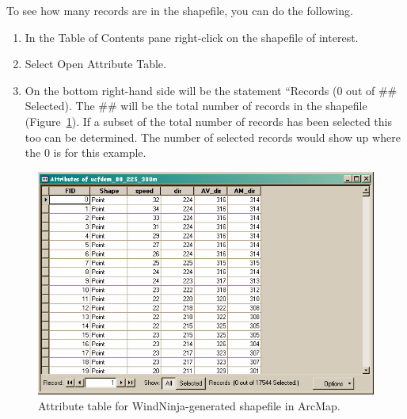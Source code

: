 \documentclass[12pt]{article}
\begin{document}
To see how many records are in the shapefile, you can do the following.
\begin{enumerate}

\item In the Table of Contents pane right-click on the shapefile of interest.
\item  Select Open Attribute Table.
\item On the bottom right-hand side will be the statement “Records (0 out of \#\# Selected). The \#\# will be the
total number of records in the shapefile (Figure~\ref{fig:Figure19}). If a subset of the total number of records has been
selected this too can be determined. The number of selected records would show up where the 0 is for this
example.

\end{enumerate}

\begin{figure}[H]
	\centering
	\includegraphics[scale=0.7]{arc_19.png}
	\caption{Attribute table for WindNinja-generated shapefile in ArcMap.}
\label{fig:Figure19}
\end{figure}
\end{document}

